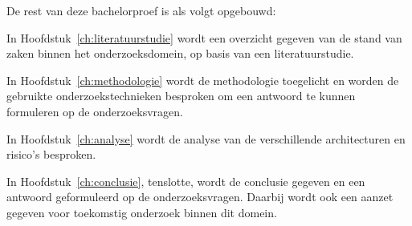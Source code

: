 
De rest van deze bachelorproef is als volgt opgebouwd:

In Hoofdstuk~\ref{ch:literatuurstudie} wordt een overzicht gegeven van de stand van zaken binnen het onderzoeksdomein, op basis van een literatuurstudie.

In Hoofdstuk~\ref{ch:methodologie} wordt de methodologie toegelicht en worden de gebruikte onderzoekstechnieken besproken om een antwoord te kunnen formuleren op de onderzoeksvragen.

In Hoofdstuk~\ref{ch:analyse} wordt de analyse van de verschillende architecturen en risico's besproken.

In Hoofdstuk~\ref{ch:conclusie}, tenslotte, wordt de conclusie gegeven en een antwoord geformuleerd op de onderzoeksvragen. Daarbij wordt ook een aanzet gegeven voor toekomstig onderzoek binnen dit domein.